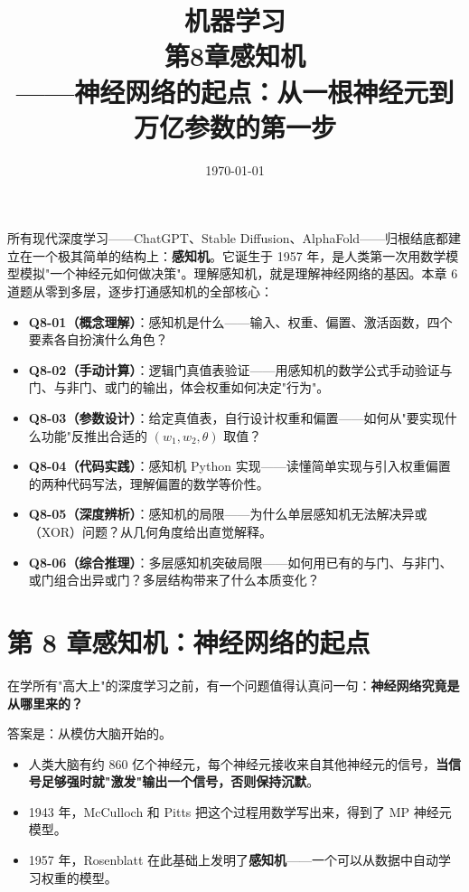 \documentclass[a4paper,11pt]{ctexart}
\title{\textbf{机器学习\\第8章\quad 感知机}\\[0.5em]
{\large\color{gray}——神经网络的起点：从一根神经元到万亿参数的第一步}}
\date{\today}
\begin{document}
\maketitle

\begin{beginnerbox}
    所有现代深度学习——ChatGPT、Stable Diffusion、AlphaFold——归根结底都建立在一个极其简单的结构上：\textbf{感知机}。它诞生于 1957 年，是人类第一次用数学模型模拟"一个神经元如何做决策"。理解感知机，就是理解神经网络的基因。本章 6 道题从零到多层，逐步打通感知机的全部核心：

    \begin{itemize}
        \item \textbf{Q8-01（概念理解）}：感知机是什么——输入、权重、偏置、激活函数，四个要素各自扮演什么角色？
        \item \textbf{Q8-02（手动计算）}：逻辑门真值表验证——用感知机的数学公式手动验证与门、与非门、或门的输出，体会权重如何决定"行为"。
        \item \textbf{Q8-03（参数设计）}：给定真值表，自行设计权重和偏置——如何从"要实现什么功能"反推出合适的 $(w_1, w_2, \theta)$ 取值？
        \item \textbf{Q8-04（代码实践）}：感知机 Python 实现——读懂简单实现与引入权重偏置的两种代码写法，理解偏置的数学等价性。
        \item \textbf{Q8-05（深度辨析）}：感知机的局限——为什么单层感知机无法解决异或（XOR）问题？从几何角度给出直觉解释。
        \item \textbf{Q8-06（综合推理）}：多层感知机突破局限——如何用已有的与门、与非门、或门组合出异或门？多层结构带来了什么本质变化？
    \end{itemize}
\end{beginnerbox}

\section{第 8 章\quad 感知机：神经网络的起点}

在学所有"高大上"的深度学习之前，有一个问题值得认真问一句：\textbf{神经网络究竟是从哪里来的？}

答案是：从模仿大脑开始的。

\begin{itemize}
    \item 人类大脑有约 860 亿个神经元，每个神经元接收来自其他神经元的信号，\textbf{当信号足够强时就"激发"输出一个信号，否则保持沉默}。
    \item 1943 年，McCulloch 和 Pitts 把这个过程用数学写出来，得到了 MP 神经元模型。
    \item 1957 年，Rosenblatt 在此基础上发明了\textbf{感知机}——一个可以从数据中自动学习权重的模型。
\end{itemize}
\end{document}
